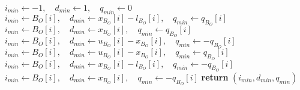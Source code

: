 \documentclass[a4paper]{article}
\begin{document}
\begin{algorithmic}
\State $i_{min} \gets -1, \quad     d_{min} \gets 1, \quad  q_{min} \gets 0$
                    \State $i_{min} \gets B_{O}[i],
                        \quad d_{min} \gets x_{B_{O}}[i]-l_{B_{O}}[i],
                        \quad q_{min} \gets q_{B_{O}}[i]$
                \EndIf
            \Else
                    \State $i_{min} \gets B_{O}[i],
                        \quad d_{min} \gets x_{B_{O}}[i],
                        \quad q_{min} \gets q_{B_{O}}[i]$
                \EndIf
            \EndIf
                \State $i_{min} \gets B_{O}[i],
                        \quad d_{min} \gets u_{B_{O}}[i]-x_{B_{O}}[i],
                        \quad q_{min} \gets -q_{B_{O}}[i]$
            \EndIf
        \EndIf
    \EndFor
\Else
                \State $i_{min} \gets B_{O}[i],
                    \quad d_{min} \gets u_{B_{O}}[i]-x_{B_{O}}[i],
                    \quad q_{min} \gets q_{B_{O}}[i]$
            \EndIf
                    \State $i_{min} \gets B_{O}[i],
                        \quad d_{min} \gets x_{B_{O}}[i]-l_{B_{O}}[i],
                        \quad q_{min} \gets -q_{B_{O}}[i]$
                \EndIf
            \Else
                    \State $i_{min} \gets B_{O}[i],
                        \quad d_{min} \gets x_{B_{O}}[i],
                        \quad q_{min} \gets -q_{B_{O}}[i]$
                \EndIf
            \EndIf
        \EndIf
    \EndFor
\EndIf
\State \textbf{return} $(i_{min}, d_{min}, q_{min})$
\EndFunction
\end{algorithmic}
\end{document}
